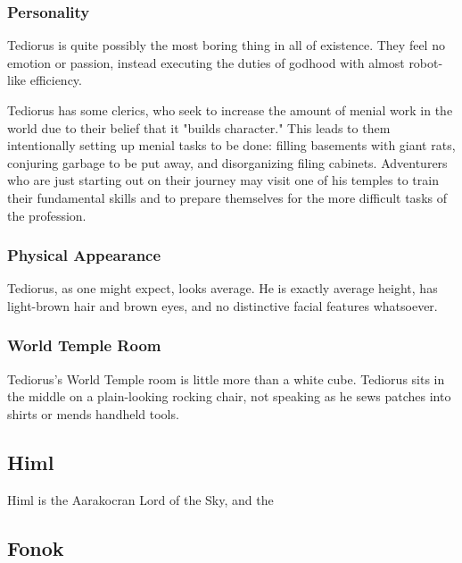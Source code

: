 \subsubsection*{Personality}
Tediorus is quite possibly the most boring thing in all of existence.
They feel no emotion or passion, instead executing the duties of godhood with almost robot-like efficiency.

Tediorus has some clerics, who seek to increase the amount of menial work in the world due to their belief that it "builds character."
This leads to them intentionally setting up menial tasks to be done: filling basements with giant rats, conjuring garbage to be put away, and disorganizing filing cabinets.
Adventurers who are just starting out on their journey may visit one of his temples to train their fundamental skills and to prepare themselves for the more difficult tasks of the profession.

\subsubsection*{Physical Appearance}
Tediorus, as one might expect, looks average.
He is exactly average height, has light-brown hair and brown eyes, and no distinctive facial features whatsoever.

\subsubsection*{World Temple Room}
Tediorus's World Temple room is little more than a white cube.
Tediorus sits in the middle on a plain-looking rocking chair, not speaking as he sews patches into shirts or mends handheld tools.

\subsection*{Himl}
\begin{goddesc}
\end{goddesc}

Himl is the Aarakocran Lord of the Sky, and the 

\subsection*{Fonok}
\begin{goddesc}
\end{goddesc}

